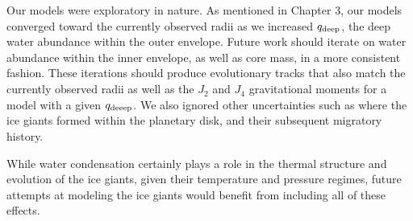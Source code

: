 \documentclass[11pt]{ucscthesisbs}
\begin{document}
Our models were exploratory in nature. As mentioned in Chapter 3, our models converged toward the currently observed radii as we increased $q_{\rm deep}$, the deep water abundance within the outer envelope. Future work should iterate on water abundance within the inner envelope, as well as core mass, in a more consistent fashion. These iterations should produce evolutionary tracks that also match the currently observed radii as well as the $J_{2}$ and $J_{4}$ gravitational moments for a model with a given $q_{\rm deeep}$. We also ignored other uncertainties such as where the ice giants formed within the planetary disk, and their subsequent migratory history.

While water condensation certainly plays a role in the thermal structure and evolution of the ice giants, given their temperature and pressure regimes, future attempts at modeling the ice giants would benefit from including all of these effects.
 

\newcommand{\newblock}{}

  
\end{document}
